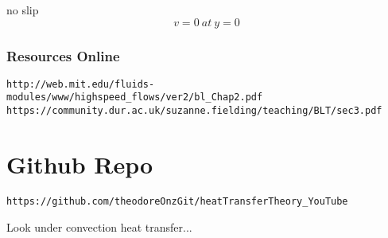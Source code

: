 \documentclass[11pt]{article}
\begin{document}
no slip
$$v=0 \ at \ y=0$$

\section{Resources Online}


\begin{verbatim}
http://web.mit.edu/fluids-modules/www/highspeed_flows/ver2/bl_Chap2.pdf
https://community.dur.ac.uk/suzanne.fielding/teaching/BLT/sec3.pdf
\end{verbatim}

\part{Github Repo}
\begin{verbatim}
https://github.com/theodoreOnzGit/heatTransferTheory_YouTube
\end{verbatim}

Look under convection heat transfer...
\end{document}
